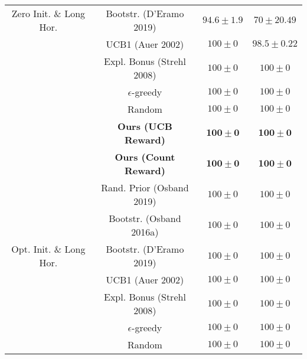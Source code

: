 \documentclass{article}
\begin{document}
\begin{table}[h]
\begin{tabular}{ c | c | c c }
 Zero Init. \& Long Hor. & Bootstr. (D'Eramo 2019) & $94.6 \pm 1.9$ & $70 \pm 20.49$ \\
 & UCB1 (Auer 2002) & $100 \pm 0$ & $98.5 \pm 0.22$ \\
 & Expl. Bonus (Strehl 2008) & ${100 \pm 0}$ & ${100 \pm 0}$ \\
 & $\epsilon$-greedy & ${100 \pm 0}$ & ${100 \pm 0}$ \\
 & Random & ${100 \pm 0}$ & ${100 \pm 0}$ \\
 \hline
 & \textbf{Ours (UCB Reward)} & $\mathbf{100 \pm 0}$ & $\mathbf{100 \pm 0}$ \\
 & \textbf{Ours (Count Reward)} & $\mathbf{100 \pm 0}$ & $\mathbf{100 \pm 0}$ \\
 & Rand. Prior (Osband 2019) & $100 \pm 0$ & $100 \pm 0$ \\
 & Bootstr. (Osband 2016a) & $100 \pm 0$ & $100 \pm 0$ \\
 Opt. Init. \& Long Hor. & Bootstr. (D'Eramo 2019) & $100 \pm 0$ & $100 \pm 0$ \\
 & UCB1 (Auer 2002) & $100 \pm 0$ & $100 \pm 0$ \\
 & Expl. Bonus (Strehl 2008) & $100 \pm 0$ & $100 \pm 0$ \\
 & $\epsilon$-greedy & $100 \pm 0$ & $100 \pm 0$ \\
 & Random & ${100 \pm 0}$ & ${100 \pm 0}$ \\
\end{tabular}
\end{table}
\end{document}
